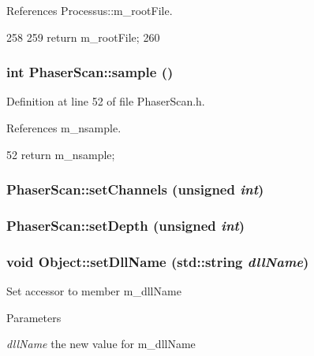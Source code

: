 References Processus::m\_\-rootFile.


\begin{DoxyCode}
258                      {
259     return m_rootFile;
260   }
\end{DoxyCode}
\hypertarget{classPhaserScan_a278292fe5bc31814dab8cd54deb76b48}{
\subsubsection[{sample}]{\setlength{\rightskip}{0pt plus 5cm}int PhaserScan::sample ()}}
\label{classPhaserScan_a278292fe5bc31814dab8cd54deb76b48}


Definition at line 52 of file PhaserScan.h.

References m\_\-nsample.


\begin{DoxyCode}
52 {return m_nsample;}
\end{DoxyCode}
\hypertarget{classPhaserScan_a12fc9ff050fc15e067ae622c37827661}{
\subsubsection[{setChannels}]{ PhaserScan::setChannels (unsigned {\em int})}}
\label{classPhaserScan_a12fc9ff050fc15e067ae622c37827661}
\hypertarget{classPhaserScan_a182d5a23019a62c3c3ad3a03f5187036}{
\subsubsection[{setDepth}]{ PhaserScan::setDepth (unsigned {\em int})}}
\label{classPhaserScan_a182d5a23019a62c3c3ad3a03f5187036}
\hypertarget{classObject_a870c5af919958c2136623b2d7816d123}{
\subsubsection[{setDllName}]{\setlength{\rightskip}{0pt plus 5cm}void Object::setDllName (std::string {\em dllName})}}
\label{classObject_a870c5af919958c2136623b2d7816d123}
Set accessor to member m\_\-dllName 
\begin{DoxyParams}{Parameters}
\item[{\em dllName}]the new value for m\_\-dllName \end{DoxyParams}


